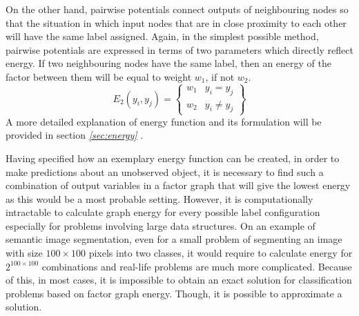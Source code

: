 On the other hand, pairwise potentials connect outputs of neighbouring nodes so that the situation in which input nodes that are in close proximity to each other will have the same label assigned. Again, in the simplest possible method, pairwise potentials are expressed in terms of two parameters which directly reflect energy. If two neighbouring nodes have the same label, then an energy of the factor between them will be equal to weight $w_1$, if not $w_2$.
\begin{equation}
    E_2(y_i,y_j)=\begin{Bmatrix}
     w_1 & y_i=y_j \\ 
     w_2 & y_i \neq y_j
    \end{Bmatrix}
\end{equation}
A more detailed explanation of energy function and its formulation will be provided in section \textit{\ref{sec:energy} }.

Having specified how an exemplary energy function can be created, in order to make predictions about an unobserved object, it is necessary to find such a combination of output variables in a factor graph that will give the lowest energy as this would be a most probable setting. However, it is computationally intractable to calculate graph energy for every possible label configuration especially for problems involving large data structures. On an example of semantic image segmentation, even for a small problem of segmenting an image with size $100\times100$ pixels into two classes, it would require to calculate energy for $2^{100\times100}$ combinations and real-life problems are much more complicated. Because of this, in most cases, it is impossible to obtain an exact solution for classification problems based on factor graph energy. Though, it is possible to approximate a solution.